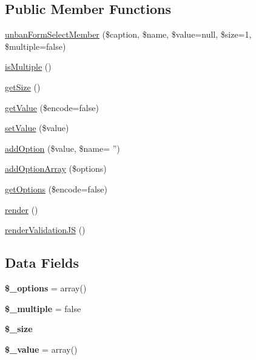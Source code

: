 \subsection*{Public Member Functions}
\begin{DoxyCompactItemize}
\item 
\hyperlink{classunban_form_select_member_ad2edcd5234bd6e1974c2b5d32c0f09a0}{unban\-Form\-Select\-Member} (\$caption, \$name, \$value=null, \$size=1, \$multiple=false)
\item 
\hyperlink{classunban_form_select_member_ac5d76ccb2e931e4abb4456d6ad492ac1}{is\-Multiple} ()
\item 
\hyperlink{classunban_form_select_member_a75cce10cdf81be6dc84881c28b3379b7}{get\-Size} ()
\item 
\hyperlink{classunban_form_select_member_ab3c79e314dfd09da4de90fb2ce5eaa9d}{get\-Value} (\$encode=false)
\item 
\hyperlink{classunban_form_select_member_a7494441b6ed08a391704971873f31432}{set\-Value} (\$value)
\item 
\hyperlink{classunban_form_select_member_ac485d7f4f2160de8fb47aa29aeed7080}{add\-Option} (\$value, \$name= '')
\item 
\hyperlink{classunban_form_select_member_a673ec8d6dc3cc0ee2f62fbe1c824ccc5}{add\-Option\-Array} (\$options)
\item 
\hyperlink{classunban_form_select_member_ac15eda2814c8ff0477244b28a315fb5a}{get\-Options} (\$encode=false)
\item 
\hyperlink{classunban_form_select_member_afde88292c44dc59faf017738dae6dffb}{render} ()
\item 
\hyperlink{classunban_form_select_member_a2747262e7fc6aba84bfc52bcf38407df}{render\-Validation\-J\-S} ()
\end{DoxyCompactItemize}
\subsection*{Data Fields}
\begin{DoxyCompactItemize}
\item 
\hypertarget{classunban_form_select_member_a1bebdc689c84eee59ad24c77e5531762}{{\bfseries \$\-\_\-options} = array()}\label{classunban_form_select_member_a1bebdc689c84eee59ad24c77e5531762}

\item 
\hypertarget{classunban_form_select_member_acae132bb5063b7d542ea6a0be0ae22f2}{{\bfseries \$\-\_\-multiple} = false}\label{classunban_form_select_member_acae132bb5063b7d542ea6a0be0ae22f2}

\item 
\hypertarget{classunban_form_select_member_a3f3a27f0a14f4760227dbc5ae3288681}{{\bfseries \$\-\_\-size}}\label{classunban_form_select_member_a3f3a27f0a14f4760227dbc5ae3288681}

\item 
\hypertarget{classunban_form_select_member_a599c02a4727030b8ecc632f7c8adafeb}{{\bfseries \$\-\_\-value} = array()}\label{classunban_form_select_member_a599c02a4727030b8ecc632f7c8adafeb}

\end{DoxyCompactItemize}


